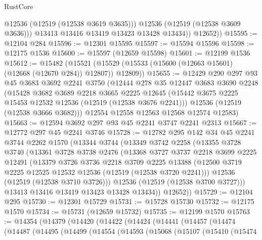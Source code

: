 \begin{lexlean}{RustCore}
\begin{coremodule}
                @12536
                (@12519 (@12538 @3619 @3635)))
              @12536
              (@12519 (@12538 @3609 @3636)))
            @13413
            @13416
            @13419
            @13423
            @13428
            @13434))
        @12652))
@15595 := @12104 @284
@15596 := @12301 @15595
@15597 := @15594 @15596
@15598 := @12175 @1536
@15600 := @15597 (@12659 @15598)
@15601 := @12199 @1536
@15612 := @15482
    (@15521 (@15529 (@15533 (@15600 (@12663 @15601) (@12668 (@12670 @284)) @12807)) @12809))
@15655 := @12429
    @290
    @297
    @93
    @45
    @3683
    @3692
    @2241
    @3750
    (@12444
      @278
      @35
      @12447
      @3683
      @3690
      @2248
      (@15428
        @3682
        @3689
        @2218
        @3665
        @2225
        @12645
        (@15442 @3675 @2225 @15453 @12532 @12536 (@12519 (@12538 @3676 @2241)))
        @12536
        (@12519 (@12538 @3666 @3682)))
      @12554
      @12558
      @12563
      @12568
      @12574
      @12583)
@15663 := @12594 @3692 @297 @93 @45 @2241 @3747 @2241 @2313
@15667 := @12772 @297 @45 @2241 @3746
@15728 := @12782
    @295
    @142
    @34
    @45
    @2241
    @3744
    @2262
    @1570
    (@13344
      @3744
      (@13349
        @3742
        @2258
        (@13355
          @3728
          @3740
          (@13361
            @3728
            @3738
            @2476
            (@13368
              @3727
              @3737
              @2218
              @3699
              @2225
              @12491
              (@13379
                @3726
                @3736
                @2218
                @3709
                @2225
                @13388
                (@12500 @3719 @2225 @12525 @12532 @12536 (@12519 (@12538 @3720 @2241)))
                @12536
                (@12519 (@12538 @3710 @3726)))
              @12536
              (@12519 (@12538 @3700 @3727)))
            @13413
            @13416
            @13419
            @13423
            @13428
            @13434))
        @12652))
@15729 := @12104 @295
@15730 := @12301 @15729
@15731 := @15728 @15730
@15732 := @12175 @1570
@15734 := @15731 (@12659 @15732)
@15735 := @12199 @1570
@15763 := @14354
    (@14379
      (@14420
        (@14422
          (@14424
            (@14441
              (@14457
                (@14474
                  (@14487
                    (@14495
                      (@14499
                        (@14554
                          (@14593
                            (@15068
                              (@15107
                                (@15410
                                  (@15474

\end{coremodule}
\end{lexlean}
